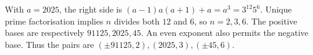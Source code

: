 With $a=2025$, the right side is $(a-1)a(a+1)+a=a^3=3^{12}5^6$. Unique prime factorisation implies $n$ divides both $12$ and $6$, so $n=2,3,6$. The positive bases are respectively $91125,2025,45$. An even exponent also permits the negative base. Thus the pairs are $\boxed{(\pm91125,2),(2025,3),(\pm45,6)}$.

